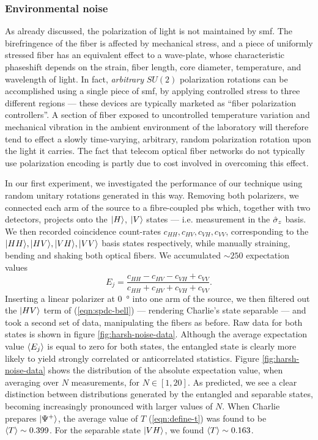 \subsubsection{Environmental noise} 
As already discussed, the polarization of light is not maintained by \acrshort{smf}. The birefringence of the fiber is affected by mechanical stress, and a piece of uniformly stressed fiber has an equivalent effect to a wave-plate, whose characteristic phaseshift depends on the strain, fiber length, core diameter, temperature, and wavelength of light. In fact, \emph{arbitrary} $SU(2)$ polarization rotations can be accomplished using a single piece of \acrshort{smf}, by applying controlled stress to three different regions --- these devices are typically marketed as ``fiber polarization controllers''. A section of fiber exposed to uncontrolled temperature variation and mechanical vibration in the ambient environment of the laboratory will therefore tend to effect a slowly time-varying, arbitrary, random polarization rotation upon the light it carries. The fact that telecom optical fiber networks do not typically use polarization encoding is partly due to cost involved in overcoming this effect.

In our first experiment, we investigated the performance of our technique using random unitary rotations generated in this way. Removing both polarizers, we connected each arm of the source to a fibre-coupled \gls{pbs} which, together with two detectors, projects onto the $\mbox{$ | H \rangle $}$, $\mbox{$ | V \rangle $}$ states --- i.e. measurement in the $\hat{\sigma}_z$ basis. We then recorded coincidence count-rates $c_{HH}, c_{HV}, c_{VH}, c_{VV}$, corresponding to the $\mbox{$ | HH \rangle $}, \mbox{$ | HV \rangle $}, \mbox{$ | VH \rangle $}, \mbox{$ | VV \rangle $}$ basis states respectively, while manually straining, bending and shaking both optical fibers. We accumulated $\sim 250$ expectation values
\begin{equation}
    E_j = \frac{c_{HH} - c_{HV} - c_{VH} + c_{VV}}{c_{HH} + c_{HV} + c_{VH} + c_{VV}}.
\end{equation}
Inserting a linear polarizer at \SI{0}{\degree} into one arm of the source, we then filtered out the $\mbox{$ | HV \rangle $}$ term of (\ref{eqn:spdc-bell}) --- rendering Charlie's state separable --- and took a second set of data, manipulating the fibers as before. Raw data for both states is shown in figure \ref{fig:harsh-noise-data}. Although the average expectation value $\langle E_j \rangle$ is equal to zero for both states, the entangled state is clearly more likely to yield strongly correlated or anticorrelated statistics. Figure \ref{fig:harsh-noise-data} shows the distribution of the absolute expectation value, when averaging over $N$ measurements, for $N \in \left[ 1, 20 \right]$. As predicted, we see a clear distinction between distributions generated by the entangled and separable states, becoming increasingly pronounced with larger values of $N$. When Charlie prepares $\mbox{$ | \Psi^+ \rangle $}$, the average value of $T$ (\ref{eqn:define-t}) was found to be $\langle T \rangle\sim 0.399$. For the separable state $\mbox{$ | VH \rangle $}$, we found $\langle T \rangle\sim0.163$. 

